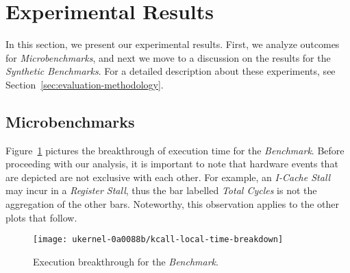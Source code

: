 \section{Experimental Results}
\label{sec:experimental-results}

	In this section, we present our experimental results. First, we
	analyze outcomes for \textit{Microbenchmarks}, and next we move to a
	discussion on the results for the \textit{Synthetic Benchmarks}. For
	a detailed description about these experiments, see
	Section~\ref{sec:evaluation-methodology}.

\subsection{Microbenchmarks}

	Figure~\ref{fig:lkcall-result} pictures the breakthrough of execution
	time for the \textit{\lkcall Benchmark}. Before proceeding with our
	analysis, it is important to note that hardware events that are
	depicted are not exclusive with each other. For example, an
	\textit{I-Cache Stall} may incur in a \textit{Register Stall}, thus
	the bar labelled \textit{Total Cycles} is not the aggregation of the
	other bars. Noteworthy, this observation applies to the other plots
	that follow.

	\begin{figure}[t]
			\texttt{[image: ukernel-0a0088b/kcall-local-time-breakdown]}
			\caption{Execution breakthrough for the \textit{\lkcall Benchmark}.}
			\label{fig:lkcall-result}
	\end{figure}
